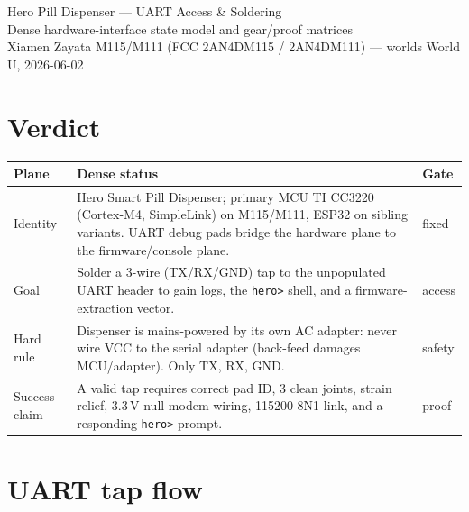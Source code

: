 \documentclass[10pt]{article}
\begin{document}
\begin{center}
{\Large Hero Pill Dispenser --- UART Access \& Soldering}\\
{\normalsize Dense hardware-interface state model and gear/proof matrices}\\
Xiamen Zayata M115/M111 (FCC 2AN4DM115 / 2AN4DM111) --- worlds World U, 2026-06-02
\end{center}

\section*{Verdict}

\begin{center}\small
\begin{tabular}{|L{1.0in}|L{4.5in}|L{0.6in}|}
\hline
\textbf{Plane} & \textbf{Dense status} & \textbf{Gate} \\
\hline
Identity & Hero Smart Pill Dispenser; primary MCU TI CC3220 (Cortex-M4, SimpleLink) on M115/M111, ESP32 on sibling variants. UART debug pads bridge the hardware plane to the firmware/console plane. & fixed \\
\hline
Goal & Solder a 3-wire (TX/RX/GND) tap to the unpopulated UART header to gain logs, the \texttt{hero>} shell, and a firmware-extraction vector. & access \\
\hline
Hard rule & Dispenser is mains-powered by its own AC adapter: never wire VCC to the serial adapter (back-feed damages MCU/adapter). Only TX, RX, GND. & safety \\
\hline
Success claim & A valid tap requires correct pad ID, 3 clean joints, strain relief, 3.3\,V null-modem wiring, 115200-8N1 link, and a responding \texttt{hero>} prompt. & proof \\
\hline
\end{tabular}
\end{center}

\section{UART tap flow}
\end{document}
